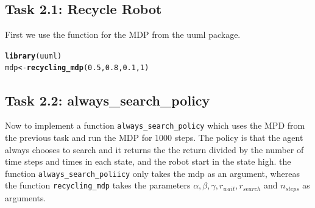 \documentclass[10pt, a4paper, english]{article}\usepackage[]{graphicx}\usepackage[dvipsnames]{xcolor}
\makeatletter
\newcommand{\hlnum}[1]{\textcolor[rgb]{0.686,0.059,0.569}{#1}}%
\newcommand{\hlstd}[1]{\textcolor[rgb]{0.345,0.345,0.345}{#1}}%
\newcommand{\hlkwb}[1]{\textcolor[rgb]{0.69,0.353,0.396}{#1}}%
\newcommand{\hlkwd}[1]{\textcolor[rgb]{0.737,0.353,0.396}{\textbf{#1}}}%
\newenvironment{kframe}{%
 \def\at@end@of@kframe{}%
 \ifinner\ifhmode%
  \def\at@end@of@kframe{\end{minipage}}%
  \begin{minipage}{\columnwidth}%
 \fi\fi%
 \def\FrameCommand##1{\hskip\@totalleftmargin \hskip-\fboxsep
 \colorbox{shadecolor}{##1}\hskip-\fboxsep
     \hskip-\linewidth \hskip-\@totalleftmargin \hskip\columnwidth}%
 \MakeFramed {\advance\hsize-\width
   \@totalleftmargin\z@ \linewidth\hsize
   \@setminipage}}%
 {\par\unskip\endMakeFramed%
 \at@end@of@kframe}
\newenvironment{knitrout}{}{} %
\makeatother
\begin{document}
\subsection{Task 2.1: Recycle Robot}
First we use the function for the MDP from the uuml package.


\begin{knitrout}
\color{fgcolor}\begin{kframe}
\begin{alltt}
\hlkwd{library}\hlstd{(uuml)}
\hlstd{mdp} \hlkwb{<-} \hlkwd{recycling_mdp}\hlstd{(}\hlnum{0.5}\hlstd{,} \hlnum{0.8}\hlstd{,} \hlnum{0.1}\hlstd{,} \hlnum{1}\hlstd{)}
\end{alltt}
\end{kframe}
\end{knitrout}

\subsection{Task 2.2: always\_search\_policy}
Now to implement a function \texttt{always\_search\_policy} which uses the MPD from the previous task and run the MDP for 1000 steps. The policy is that the agent always chooses to search and it returns the the return divided by the number of time steps and times in each state, and the robot start in the state high. the function \texttt{always\_search\_poliicy} only takes the mdp as an argument, whereas the function \texttt{recycling\_mdp} takes the parameters $\alpha, \beta, \gamma, r_{wait}, r_{search}$ and $n_{steps}$ as arguments.
\end{document}
